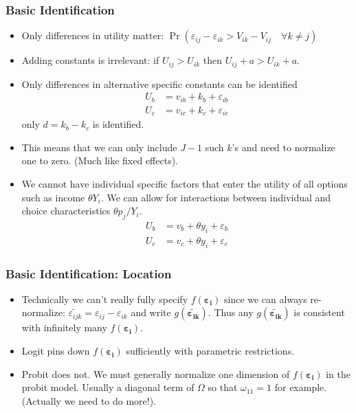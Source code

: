 \documentclass[aspectratio=169,11pt]{beamer}
\begin{document}
\begin{frame}
\frametitle{Basic Identification}
\small
\begin{itemize}
\item Only differences in utility matter: $\Pr( \varepsilon_{ij}-\varepsilon_{ik} > V_{ik} - V_{ij} \quad \forall k \neq j)$
\item Adding constants is irrelevant: if $U_{ij} > U_{ik}$ then $U_{ij} + a > U_{ik} + a$.
\item Only differences in alternative specific constants can be identified
\begin{align*}
U_b &= v_{ib} + k_b  + \varepsilon_{ib}\\
U_c &= v_{ic} + k_c  + \varepsilon_{ic}
\end{align*}
only $d = k_b - k_c$ is identified.
\item This means that we can only include $J-1$ such $k$'s and need to normalize one to zero. (Much like fixed effects).
\item We cannot have individual specific factors that enter the utility of all options such as income $\theta Y_i$. We can allow for interactions between individual and choice characteristics $\theta p_{j}/ Y_i$.
\begin{align*}
U_b &= v_{b} + \theta y_i  + \varepsilon_b\\
U_c &= v_{c} + \theta y_i  + \varepsilon_c
\end{align*}

\end{itemize}
\end{frame}

\begin{frame}
\frametitle{Basic Identification: Location}
\begin{itemize}
\item Technically we can't really fully specify $f(\symbf{\varepsilon_i})$ since we can always re-normalize: $\widetilde{\varepsilon_{ijk}} = \varepsilon_{ij} - \varepsilon_{ik}$ and write $g(\widetilde{\symbf{\varepsilon_{ik}}})$. Thus any $g(\widetilde{\symbf{\varepsilon_{ik}}})$ is consistent with infinitely many $f(\symbf{\varepsilon_i})$.
\item Logit pins down $f(\symbf{\varepsilon_i})$ sufficiently with parametric restrictions.
\item Probit does not. We must generally normalize one dimension of $f(\symbf{\varepsilon_i})$ in the probit model. Usually a diagonal term of $\Omega$ so that $\omega_{11} =1$ for example. (Actually we need to do more!).
\end{itemize}
\end{frame}
\end{document}
